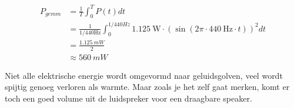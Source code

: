 \documentclass{article}
\begin{document}
			\begin{align}
			P_{gemm} &= \frac{1}{T} \int_0^T P(t) dt \\ 
			& = \frac{1}{1/440 \text{Hz}} \int_0^{1/440Hz} 1.125~\text{W} \cdot \left( \sin \left(2\pi \cdot 440~\text{Hz} \cdot t\right) \right)^2 dt \\&= \frac{1.125~mW}{2} \\ 
			& \approx 560~mW
			\end{align}


			Niet alle elektrische energie  wordt omgevormd naar geluidsgolven, veel wordt spijtig genoeg verloren als warmte. Maar zoals je het zelf gaat merken, komt er toch een goed volume uit de luidspreker voor een draagbare speaker.
\end{document}
